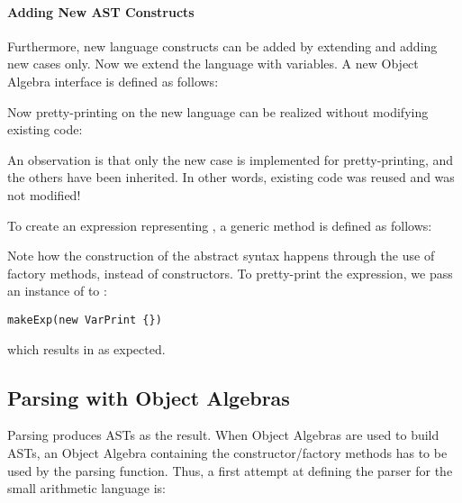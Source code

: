 
\paragraph{Adding New AST Constructs}
Furthermore, new language constructs can be added by extending  and adding new cases only. Now we extend the language
with variables. A new Object Algebra interface  is defined as follows:

Now pretty-printing on the new language can be realized without modifying existing code:

An observation is that only the new case is implemented for pretty-printing, and the others have been inherited.
In other words, existing code was reused and was not modified!

To create an expression representing , a generic method is defined as follows:


Note how the construction of the abstract syntax happens through
the use of factory methods, instead of constructors.
To pretty-print the expression,
we pass an instance of  to :

\begin{lstlisting}
makeExp(new VarPrint {})
\end{lstlisting}
which results in  as expected.

\subsection{Parsing with Object Algebras}\label{subsec:parsingwithoa}

Parsing produces ASTs as the result. When Object Algebras are used
to build ASTs, an Object Algebra containing the constructor/factory
methods has to be used by the parsing function. Thus, a first attempt
at defining the parser for the small arithmetic language is:

